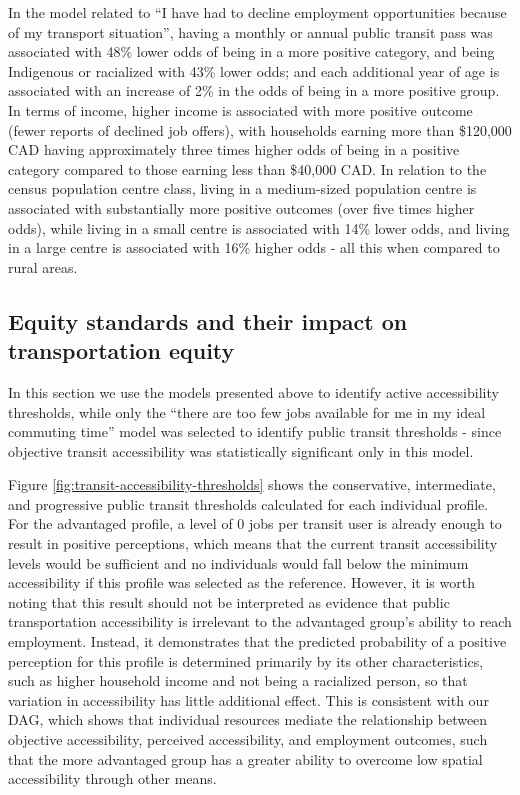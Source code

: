 \documentclass[preprint, 3p,
authoryear]{elsarticle} %
\begin{document}
In the model related to ``I have had to decline employment opportunities
because of my transport situation'', having a monthly or annual public
transit pass was associated with 48\% lower odds of being in a more
positive category, and being Indigenous or racialized with 43\% lower
odds; and each additional year of age is associated with an increase of
2\% in the odds of being in a more positive group. In terms of income,
higher income is associated with more positive outcome (fewer reports of
declined job offers), with households earning more than \$120,000 CAD
having approximately three times higher odds of being in a positive
category compared to those earning less than \$40,000 CAD. In relation
to the census population centre class, living in a medium-sized
population centre is associated with substantially more positive
outcomes (over five times higher odds), while living in a small centre
is associated with 14\% lower odds, and living in a large centre is
associated with 16\% higher odds - all this when compared to rural
areas.

\subsection{Equity standards and their impact on transportation
equity}\label{equity-standards-and-their-impact-on-transportation-equity}

In this section we use the models presented above to identify active
accessibility thresholds, while only the ``there are too few jobs
available for me in my ideal commuting time'' model was selected to
identify public transit thresholds - since objective transit
accessibility was statistically significant only in this model.

Figure \ref{fig:transit-accessibility-thresholds} shows the
conservative, intermediate, and progressive public transit thresholds
calculated for each individual profile. For the advantaged profile, a
level of 0 jobs per transit user is already enough to result in positive
perceptions, which means that the current transit accessibility levels
would be sufficient and no individuals would fall below the minimum
accessibility if this profile was selected as the reference. However, it
is worth noting that this result should not be interpreted as evidence
that public transportation accessibility is irrelevant to the advantaged
group's ability to reach employment. Instead, it demonstrates that the
predicted probability of a positive perception for this profile is
determined primarily by its other characteristics, such as higher
household income and not being a racialized person, so that variation in
accessibility has little additional effect. This is consistent with our
DAG, which shows that individual resources mediate the relationship
between objective accessibility, perceived accessibility, and employment
outcomes, such that the more advantaged group has a greater ability to
overcome low spatial accessibility through other means.
\end{document}
